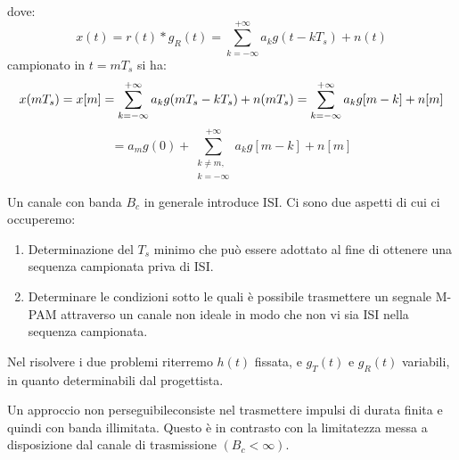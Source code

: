 \begin{center}
\end{center}

dove:
\[
    x(t) = r(t) \ast g_R(t) = \sum_{k=-\infty}^{+\infty} a_k g(t - kT_s) + n(t)
\]
campionato in $t = mT_s$ si ha:
\[
        x(mT_s) = x[m] = \sum_{k=-\infty}^{+\infty} a_k g(mT_s - kT_s) + n(mT_s) = \sum_{k=-\infty}^{+\infty} a_k g[m-k] + n[m] \\ 
 \]
\[
        = a_m g(0) + \sum_{\substack{k \neq m,\\ k=-\infty}}^{+\infty} a_k g[m-k] + n[m]
\]



Un canale con banda \( B_c \) in generale introduce ISI. Ci sono due aspetti di cui ci occuperemo:

\begin{enumerate}
    \item Determinazione del \( T_s \) minimo che può essere adottato al fine di ottenere una sequenza campionata priva di ISI.
    \item Determinare le condizioni sotto le quali è possibile trasmettere un segnale M-PAM attraverso un canale non ideale in modo che non vi sia ISI nella sequenza campionata.
\end{enumerate}

Nel risolvere i due problemi riterremo \( h(t) \) fissata, e \( g_T(t) \) e \( g_R(t) \) variabili, in quanto determinabili dal progettista.

Un approccio non perseguibileconsiste nel trasmettere impulsi di durata finita e quindi con banda illimitata. Questo è in contrasto con la limitatezza messa a disposizione dal canale di trasmissione \( (B_c < \infty) \).


